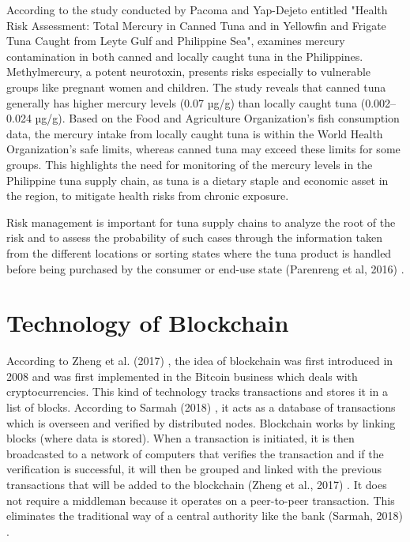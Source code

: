 According to the study conducted by Pacoma and Yap-Dejeto \nocite{rrl-FATSC6} entitled "Health Risk Assessment: Total Mercury in Canned Tuna and in Yellowfin and Frigate Tuna Caught from Leyte Gulf and Philippine Sea", examines mercury contamination in both canned and locally caught tuna in the Philippines. Methylmercury, a potent neurotoxin, presents risks especially to vulnerable groups like pregnant women and children. The study reveals that canned tuna generally has higher mercury levels (0.07 µg/g) than locally caught tuna (0.002–0.024 µg/g). Based on the Food and Agriculture Organization’s fish consumption data, the mercury intake from locally caught tuna is within the World Health Organization’s safe limits, whereas canned tuna may exceed these limits for some groups. This highlights the need for monitoring of the mercury levels in the Philippine tuna supply chain, as tuna is a dietary staple and economic asset in the region, to mitigate health risks from chronic exposure.

Risk management is important for tuna supply chains to analyze the root of the risk and to assess the probability of such cases through the information taken from the different locations or sorting states where the tuna product is handled before being purchased by the consumer or end-use state (Parenreng et al, 2016) \nocite{rrl-FATSC7}.

\section{Technology of Blockchain}

According to Zheng et al. (2017) \nocite{rrl-ToB1}, the idea of blockchain was first introduced in 2008 and was first implemented in the Bitcoin business which deals with cryptocurrencies. This kind of technology tracks transactions and stores it in a list of blocks. According to Sarmah (2018) \nocite{rrl-ToB2}, it acts as a database of transactions which is overseen and verified by distributed nodes. Blockchain works by linking blocks (where data is stored). When a transaction is initiated, it is then broadcasted to a network of computers that verifies the transaction and if the verification is successful, it will then be grouped and linked with the previous transactions that will be added to the blockchain (Zheng et al., 2017) \nocite{rrl-ToB3}. It does not require a middleman because it operates on a peer-to-peer transaction. This eliminates the traditional way of a central authority like the bank (Sarmah, 2018) \nocite{rrl-ToB2}. 

